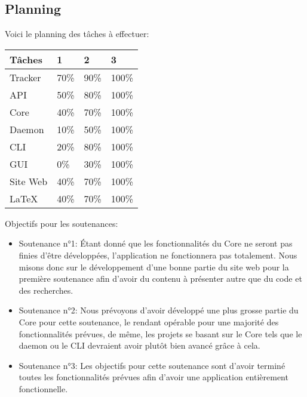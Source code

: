 \documentclass[11pt, a4paper]{specifications}
\begin{document}
    \subsection{Planning}
Voici le planning des tâches à effectuer:
\begin{table}[H]
\centering
\begin{tabular}{llll} \hline
\multicolumn{1}{|l|}{Tâches}   & \multicolumn{1}{l|}{1}    & \multicolumn{1}{l|}{2}    & \multicolumn{1}{l|}{3}    \\ \hline
\multicolumn{1}{|l|}{Tracker}  & \multicolumn{1}{l|}{70\%} & \multicolumn{1}{l|}{90\%} & \multicolumn{1}{l|}{100\%} \\ \hline
\multicolumn{1}{|l|}{API}      & \multicolumn{1}{l|}{50\%} & \multicolumn{1}{l|}{80\%} & \multicolumn{1}{l|}{100\%} \\ \hline
\multicolumn{1}{|l|}{Core}     & \multicolumn{1}{l|}{40\%} & \multicolumn{1}{l|}{70\%} & \multicolumn{1}{l|}{100\%} \\ \hline
\multicolumn{1}{|l|}{Daemon}   & \multicolumn{1}{l|}{10\%} & \multicolumn{1}{l|}{50\%} & \multicolumn{1}{l|}{100\%} \\ \hline
\multicolumn{1}{|l|}{CLI}      & \multicolumn{1}{l|}{20\%} & \multicolumn{1}{l|}{80\%} & \multicolumn{1}{l|}{100\%} \\ \hline
\multicolumn{1}{|l|}{GUI}      & \multicolumn{1}{l|}{0\%}  & \multicolumn{1}{l|}{30\%} & \multicolumn{1}{l|}{100\%} \\ \hline
\multicolumn{1}{|l|}{Site Web} & \multicolumn{1}{l|}{40\%} & \multicolumn{1}{l|}{70\%} & \multicolumn{1}{l|}{100\%} \\ \hline
\multicolumn{1}{|l|}{\LaTeX} & \multicolumn{1}{l|}{40\%} & \multicolumn{1}{l|}{70\%} & \multicolumn{1}{l|}{100\%} \\ \hline
\end{tabular}
\end{table}
Objectifs pour les soutenances:
\begin{itemize}
\item Soutenance n°1: Étant donné que les fonctionnalités du Core ne seront pas finies d'être développées, l'application ne fonctionnera pas totalement. Nous misons donc sur le développement d'une bonne partie du site web pour la première soutenance afin d'avoir du contenu à présenter autre que du code et des recherches.
\item Soutenance n°2: Nous prévoyons d'avoir développé une plus grosse partie du Core pour cette soutenance, le rendant opérable pour une majorité des fonctionnalités prévues, de même, les projets se basant sur le Core tels que le daemon ou le CLI devraient avoir plutôt bien avancé grâce à cela.
\item Soutenance n°3: Les objectifs pour cette soutenance sont d'avoir terminé toutes les fonctionnalités prévues afin d'avoir une application entièrement fonctionnelle.
\end{itemize}
\end{document}
